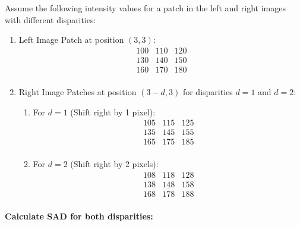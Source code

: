 \documentclass[22pt]{report}
\begin{document}
Assume the following intensity values for a patch in the left and right images with different disparities:
\begin{enumerate}
\item Left Image Patch at position \((3,3)\): \\
\[
\begin{array}{ccc}
100 & 110 & 120 \\
130 & 140 & 150 \\
160 & 170 & 180 \\
\end{array}
\]
\item Right Image Patches at position \((3-d,3)\) for disparities \( d=1 \) and \( d=2 \):
\begin{enumerate}
    

\item For \( d=1 \) (Shift right by 1 pixel):
\[
\begin{array}{ccc}
105 & 115 & 125 \\
135 & 145 & 155 \\
165 & 175 & 185 \\
\end{array}
\]

\item For \( d=2 \) (Shift right by 2 pixels):
\[
\begin{array}{ccc}
108 & 118 & 128 \\
138 & 148 & 158 \\
168 & 178 & 188 \\
\end{array}
\]
\end{enumerate}
\end{enumerate}

\textbf{Calculate SAD for both disparities:} \\
\end{document}
